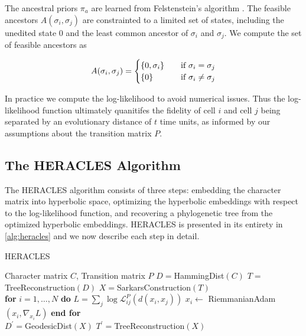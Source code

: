 \documentclass{article}
\begin{document}
The ancestral priors $\pi_a$ are learned from Felstenstein's algorithm \cite{felsenstein1973maximum}. The feasible ancestors $A(\sigma_i, \sigma_j)$ are constrainted to a limited set of states, including the unedited state $0$ and the least common ancestor of $\sigma_i$ and $\sigma_j$. We compute the set of feasible ancestors as

\begin{equation}
  A(\sigma_i, \sigma_j) = \begin{cases}
    \{0, \sigma_i \} & \textrm{\quad if } \sigma_i = \sigma_j \\
    \{0 \} & \textrm{\quad if } \sigma_i \neq \sigma_j \\
  \end{cases}
\end{equation}

In practice we compute the log-likelihood to avoid numerical issues. Thus the log-likelihood function ultimately quanitifes the fidelity of cell $i$ and cell $j$ being separated by an evolutionary distance of $t$ time units, as informed by our assumptions about the transition matrix $P$.

\subsection{The HERACLES Algorithm}

The HERACLES algorithm consists of three steps: embedding the character matrix into hyperbolic space, optimizing the hyperbolic embeddings with respect to the log-likelihood function, and recovering a phylogenetic tree from the optimized hyperbolic embeddings. HERACLES is presented in its entirety in \ref{alg:heracles} and we now describe each step in detail.

\begin{algorithm}[t]
  \caption{HERACLES}
  \label{alg:heracles}
  \begin{algorithmic}
  \Require Character matrix $C$, Transition matrix $P$
  \State $D = $HammingDist$(C)$ 
  \State $T = $TreeReconstruction$(D)$ 
  \State $X = $SarkarsConstruction$(T)$ 
  \\
  \State \textbf{for} $i = 1, \dots, N$ \textbf{do}
  \State \quad $L = \sum_{j} \log \mathcal{L}_{ij}^P\left(d(x_i, x_j) \right)$ 
  \State \quad $x_i \leftarrow$ RiemmanianAdam$(x_i, \nabla_{x_i} L)$ 
  \State \textbf{end for}
  \EndWhile
  \\
  \State $D^\prime = $GeodesicDist$(X)$ 
  \State $T^\prime = $TreeReconstruction$(X)$ 
  \end{algorithmic}
\end{algorithm}
\end{document}
